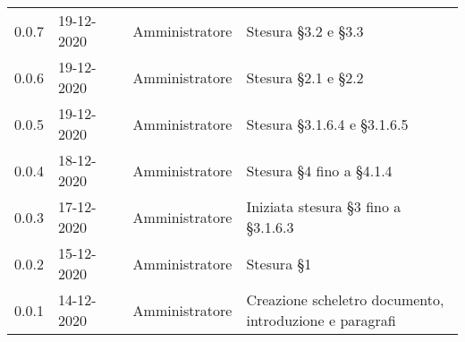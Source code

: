 {\begin{longtable}{C{1.7cm} C{2.5cm} C{3.2cm} C{2.7cm} C{4.8cm}}
0.0.7 & 19-12-2020 & \RA{} & Amministratore & Stesura \S 3.2 e \S 3.3 \\
0.0.6 & 19-12-2020 & \ZM{} & Amministratore & Stesura \S 2.1 e \S 2.2 \\
0.0.5 & 19-12-2020 & \PA{} & Amministratore & Stesura \S 3.1.6.4 e \S 3.1.6.5 \\
0.0.4 & 18-12-2020 & \SH{} & Amministratore & Stesura \S 4 fino a \S 4.1.4\\
0.0.3 & 17-12-2020 & \PA{} & Amministratore & Iniziata stesura \S 3 fino a \S 3.1.6.3 \\
0.0.2 & 15-12-2020 & \PA{} & Amministratore & Stesura \S 1 \\
0.0.1 & 14-12-2020 & \ZM{} & Amministratore & Creazione scheletro documento, introduzione e paragrafi\\
		
\end{longtable}
}
